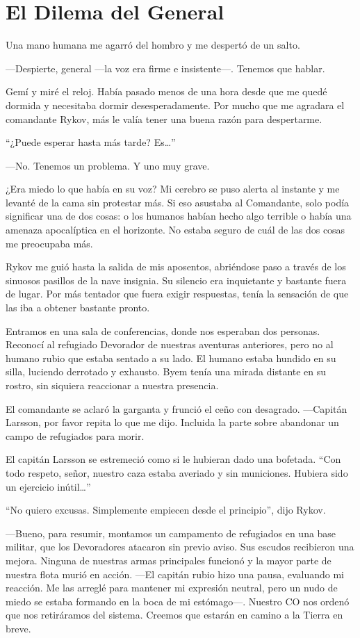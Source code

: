 \chapter{El Dilema del General}\label{sec:el-dilema-del-general}

Una mano humana me agarró del hombro y me despertó de un salto.

—Despierte, general —la voz era firme e insistente—. Tenemos que hablar.

Gemí y miré el reloj. Había pasado menos de una hora desde que me quedé dormida y necesitaba dormir desesperadamente. Por mucho que me agradara el comandante Rykov, más le valía tener una buena razón para despertarme.

``¿Puede esperar hasta más tarde? Es…''


—No. Tenemos un problema. Y uno muy grave.

¿Era miedo lo que había en su voz? Mi cerebro se puso alerta al instante y me levanté de la cama sin protestar más. Si eso asustaba al Comandante, solo podía significar una de dos cosas: o los humanos habían hecho algo terrible o había una amenaza apocalíptica en el horizonte. No estaba seguro de cuál de las dos cosas me preocupaba más.

Rykov me guió hasta la salida de mis aposentos, abriéndose paso a través de los sinuosos pasillos de la nave insignia. Su silencio era inquietante y bastante fuera de lugar. Por más tentador que fuera exigir respuestas, tenía la sensación de que las iba a obtener bastante pronto.

Entramos en una sala de conferencias, donde nos esperaban dos personas. Reconocí al refugiado Devorador de nuestras aventuras anteriores, pero no al humano rubio que estaba sentado a su lado. El humano estaba hundido en su silla, luciendo derrotado y exhausto. Byem tenía una mirada distante en su rostro, sin siquiera reaccionar a nuestra presencia.

El comandante se aclaró la garganta y frunció el ceño con desagrado. —Capitán Larsson, por favor repita lo que me dijo. Incluida la parte sobre abandonar un campo de refugiados para morir.

El capitán Larsson se estremeció como si le hubieran dado una bofetada. ``Con todo respeto, señor, nuestro caza estaba averiado y sin municiones. Hubiera sido un ejercicio inútil…''

``No quiero excusas. Simplemente empiecen desde el principio'', dijo Rykov.

—Bueno, para resumir, montamos un campamento de refugiados en una base militar, que los Devoradores atacaron sin previo aviso. Sus escudos recibieron una mejora. Ninguna de nuestras armas principales funcionó y la mayor parte de nuestra flota murió en acción. —El capitán rubio hizo una pausa, evaluando mi reacción. Me las arreglé para mantener mi expresión neutral, pero un nudo de miedo se estaba formando en la boca de mi estómago—. Nuestro CO nos ordenó que nos retiráramos del sistema. Creemos que estarán en camino a la Tierra en breve.

